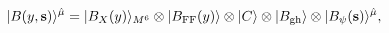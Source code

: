 \begin{equation}
 | B(y,{\bf s}) \rangle^{\hat \mu}
 = | B_X(y) \rangle_{M^6} \otimes | B_{\rm FF}(y) \rangle
   \otimes | C \rangle \otimes | B_{\rm gh} \rangle
   \otimes | B_\psi({\bf s}) \rangle^{\hat \mu},
\end{equation}

